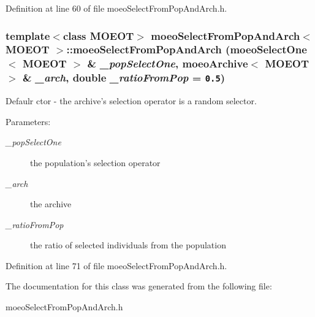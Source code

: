 Definition at line 60 of file moeo\-Select\-From\-Pop\-And\-Arch.h.
\subsubsection{\setlength{\rightskip}{0pt plus 5cm}template$<$class MOEOT$>$ \bf{moeo\-Select\-From\-Pop\-And\-Arch}$<$ MOEOT $>$::\bf{moeo\-Select\-From\-Pop\-And\-Arch} (\bf{moeo\-Select\-One}$<$ MOEOT $>$ \& {\em \_\-pop\-Select\-One}, \bf{moeo\-Archive}$<$ MOEOT $>$ \& {\em \_\-arch}, double {\em \_\-ratio\-From\-Pop} = {\tt 0.5})\hspace{0.3cm}{\tt  [inline]}}\label{classmoeoSelectFromPopAndArch_1c225b5f7b5a5ce6e87b46a7ea4a4cd0}


Defaulr ctor - the archive's selection operator is a random selector. 

\begin{Desc}
\item[Parameters:]
\begin{description}
\item[{\em \_\-pop\-Select\-One}]the population's selection operator \item[{\em \_\-arch}]the archive \item[{\em \_\-ratio\-From\-Pop}]the ratio of selected individuals from the population \end{description}
\end{Desc}


Definition at line 71 of file moeo\-Select\-From\-Pop\-And\-Arch.h.

The documentation for this class was generated from the following file:\begin{CompactItemize}
\item 
moeo\-Select\-From\-Pop\-And\-Arch.h\end{CompactItemize}
